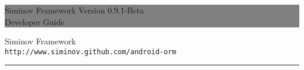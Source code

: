 \documentclass[12pt]{report}
\newcommand{\HRule}[1]{\hfill \rule{0.2\linewidth}{#1}} %
\begin{document}
\thispagestyle{empty} %


\colorbox{grey}{
	\parbox[t]{1.0\linewidth}{
		\centering \fontsize{50pt}{80pt}\selectfont %
		\vspace*{0.7cm} %
		
		\hfill Siminov Framework Version 0.9.1-Beta\\
		\hfill Developer Guide\par
		
		\vspace*{0.7cm} %
	}
}


	\vfill %


	{\centering \large 
\hfill Siminov Framework \\
\hfill \texttt{http://www.siminov.github.com/android-orm} \\

\HRule{1pt}} %


\clearpage %


\noindent
\setcounter{secnumdepth}{3}
\setcounter{tocdepth}{3}


\tableofcontents













\end{document}
